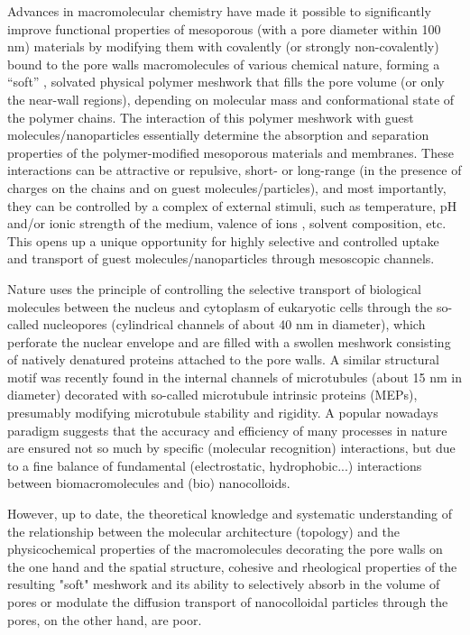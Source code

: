 \documentclass[12pt, a4paper]{article}
\begin{document}
Advances in macromolecular chemistry have made it possible to significantly improve functional properties of mesoporous (with a pore diameter within 100 nm) 
materials by modifying them with covalently (or strongly non-covalently) bound to the pore walls macromolecules of various chemical nature,  
forming a “soft” , solvated physical polymer meshwork that fills the pore volume (or only the near-wall regions), 
depending on molecular mass and conformational state of the polymer chains. 
The interaction of this polymer meshwork with guest molecules/nanoparticles 
essentially determine the absorption and separation properties of the polymer-modified mesoporous materials and membranes. 
These interactions can be attractive or repulsive, short- or long-range (in the presence of charges on the chains and on guest molecules/particles), 
and most importantly, they can be controlled by a complex of external stimuli, such as temperature, pH and/or ionic strength of the medium, valence of ions , 
solvent composition, etc. This opens up a unique opportunity for highly selective and controlled uptake and transport of guest molecules/nanoparticles through mesoscopic channels. 

Nature uses the principle of controlling the selective transport of biological molecules 
between the nucleus and cytoplasm of eukaryotic cells through the so-called nucleopores (cylindrical channels of about 40 nm in diameter), 
which perforate the nuclear envelope and are filled with a swollen meshwork consisting of natively denatured proteins attached to the pore walls. 
A similar structural motif was recently found in the internal channels of microtubules (about 15 nm in diameter) 
decorated with so-called microtubule intrinsic proteins (MEPs), presumably modifying microtubule stability and rigidity.
A popular nowadays paradigm suggests that the accuracy and efficiency of many processes in nature are ensured 
not so much by specific (molecular recognition) interactions, but due to a fine balance of fundamental (electrostatic, hydrophobic...) 
interactions between biomacromolecules and (bio) nanocolloids.  

However, up to date, the theoretical knowledge and systematic understanding of the relationship between the molecular architecture (topology) 
and the physicochemical properties of the macromolecules decorating the pore walls on the one hand and the spatial structure, 
cohesive and rheological properties of the resulting "soft" meshwork and its ability to selectively absorb in the 
volume of pores or modulate the diffusion transport of nanocolloidal particles through the pores, on the other hand,  are poor. 
\end{document}

